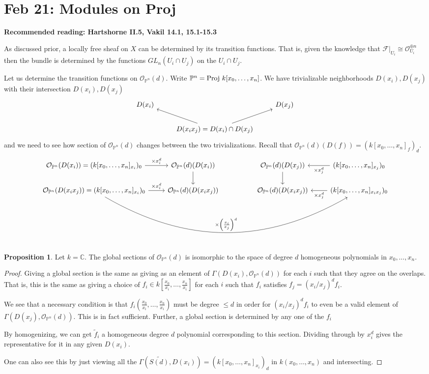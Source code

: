 \documentclass[10pt,reqno]{amsart}
\theoremstyle{definition}
\newtheorem{proposition}[theorem]{Proposition}
\theoremstyle{remark}
\numberwithin{equation}{section}
\numberwithin{theorem}{section}
\newcommand{\C}{{\mathbb C}}
\newcommand{\OO}{{\mathcal O}}
\newcommand{\proj}{\textup{Proj }}
\newcommand{\FF}{{\mathscr F}}
\newcommand{\wt}{\widetilde}
\newcommand{\PP}{{\mathbb P}}
\begin{document}
\section{Feb 21: Modules on Proj}
\textbf{Recommended reading: Hartshorne II.5, Vakil 14.1, 15.1-15.3}

As discussed prior, a locally free sheaf on $X$ can be determined by its transition functions. That is, given the knowledge that $\FF|_{U_i} \cong \OO_{U_i}^{\oplus n}$ then the bundle is determined by the functions $GL_n(U_i \cap U_j)$ on the $U_i \cap U_j$.

Let us determine the transition functions on $\OO_{\PP^n}(d)$. Write $\PP^n = \proj k[x_0,\dots,x_n]$.  We have trivializable neighborhoods $D(x_i), D(x_j)$ with their intersection $D(x_i),D(x_j)$
\[\begin{tikzcd}
D(x_i)  && D(x_j) \\
 &  \arrow[ul] \arrow[ur]D(x_ix_j) = D(x_i) \cap D(x_j)&
\end{tikzcd}\]
and we need to see how section of $\OO_{\PP^n}(d)$ changes between the two trivializations. Recall that $\OO_{\PP^n}(d)(D(f)) = (k[x_0,\dots,x_n]_f)_d$.
\[\begin{tikzcd}[scale=.8]
\OO_{\PP^n}(D(x_i)) = (k[x_0,\dots,x_n]_{x_i})_0 \arrow[r,"\times x_i^d"]&  \OO_{\PP^n}(d)(D(x_i)) \arrow[d]& &  \OO_{\PP^n}(d)(D(x_j)) \arrow[d]  &  (k[x_0,\dots,x_n]_{x_j})_0 \arrow[l,"\times x_j^d"]\\
\OO_{\PP^n}(D(x_ix_j)) = (k[x_0,\dots,x_n]_{x_i})_0 \arrow[r,"\times x_i^d"] \arrow[rrrr, bend right, "\times \left(\frac{x_i}{x_j}\right)^d"]&  \OO_{\PP^n}(d)(D(x_ix_j))& &  \OO_{\PP^n}(d)(D(x_ix_j))  &  (k[x_0,\dots,x_n]_{x_ix_j})_0 \arrow[l,"\times x_j^d"]\\
\end{tikzcd}
\]

\begin{proposition} Let $k = \C$. The global sections of $\OO_{\PP^n}(d)$ is isomorphic to the space of degree $d$ homogeneous polynomials in $x_0,\dots, x_n$.
\end{proposition}
\begin{proof}
Giving a global section is the same as giving as an element of $\Gamma(D(x_i), \OO_{\PP^n}(d))$ for each $i$ such that they agree on the overlaps. That is, this is the same as giving a choice of $f_i \in k[\frac{x_0}{x_i}, \dots, \frac{x_n}{x_i}]$ for each $i$ such that $f_i$ satisfies $f_j = (x_i/x_j)^df_i$.

We see that a necessary condition is that $f_i(\frac{x_0}{x_i},\dots,\frac{x_n}{x_i})$ must be degree $\le d$ in order for $ (x_i/x_j)^df_i$ to even be a valid element of $\Gamma(D(x_j), \OO_{\PP^n}(d))$. This is in fact sufficient. Further, a global section is determined by any one of the $f_i$

By homogenizing, we can get $\wt{f}_i$ a homogeneous degree $d$ polynomial corresponding to this section. Dividing through by $x_i^d$ gives the representative for it in any given $D(x_i)$. 

One can also see this by just viewing all the $\Gamma(\wt{S(d)},D(x_i)) = (k[x_0,\dots,x_n]_{x_i})_d$ in $k(x_0,\dots,x_n)$ and intersecting.
\end{proof}
\end{document}
